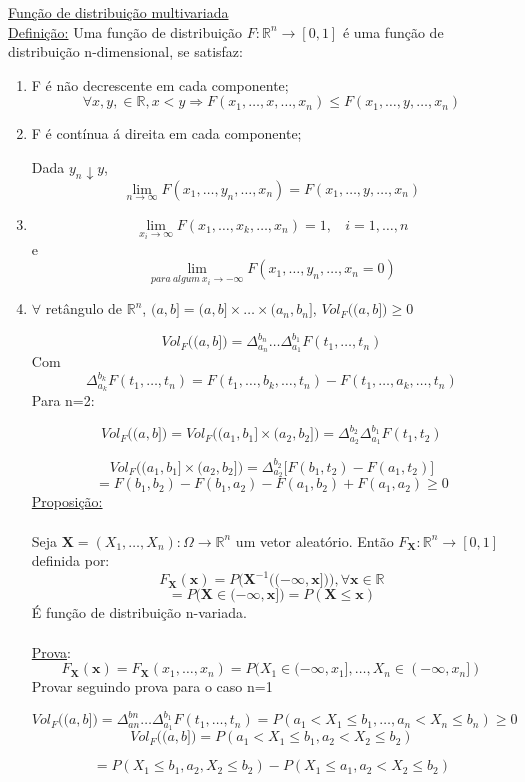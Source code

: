 \documentclass[a4paper,12pt]{article}
\begin{document}
\newpage
\underline{Função de distribuição multivariada }\\
\underline{Definição:} Uma função de distribuição $F:\mathbb R^n \longrightarrow[0,1]$ é uma função de distribuição n-dimensional, se satisfaz:
\begin{enumerate}[label=\roman*)]
	\item F é não decrescente em cada componente;
	$$\forall x,y,\in \mathbb R, x<y\Rightarrow 
	F(x_1,\ldots,x,\ldots,x_n)\le 	F(x_1,\ldots,y,\ldots,x_n)
	 $$
	 \item F é contínua á direita em cada componente;

Dada $y_n\downarrow y$,
$$\lim\limits_{n\rightarrow \infty} F(x_1,\ldots,y_n,\ldots,x_n)= 	F(x_1,\ldots,y,\ldots,x_n) $$
\item 
$$\lim\limits_{x_i\rightarrow \infty} F(x_1,\ldots,x_k,\ldots,x_n)=1, \ \ \ \ i=1,\ldots,n $$
e
$$\lim\limits_{para \ algum \ x_i\rightarrow- \infty} F(x_1,\ldots,y_n,\ldots,x_n=0)$$
\item  $\forall$ retângulo de $\mathbb R^n$, $(a,b ] =  (a,b ]\times\ldots\times (a_n,b_n ]$, $Vol_F\bigg(
 (a,b ]
\bigg)\ge 0 $

$$Vol_F\bigg(
(a,b ]
\bigg) =  \Delta^{b_n}_{a_n}\ldots\Delta^{b_1}_{a_1}F(t_1,\ldots,t_n)$$
Com
$$\Delta^{b_k}_{a_k}F(t_1,\ldots,t_n)=F(t_1,\ldots,b_k,\ldots,t_n) -F(t_1,\ldots,a_k,\ldots,t_n)  $$
Para n=2:

$$Vol_F\bigg((a,b]\bigg)=Vol_F\bigg(
(a_1,b_1]\times(a_2,b_2]
\bigg)=\Delta^{b_2}_{a_2}\Delta^{b_1}_{a_1}F(t_1,t_2) $$

$$Vol_F\bigg(
(a_1,b_1]\times(a_2,b_2]
\bigg)=\Delta^{b_2}_{a_2}\bigg[
F(b_1,t_2)-F(a_1,t_2)
\bigg] 
$$
$$
=
F(b_1,b_2)-F(b_1,a_2)-F(a_1,b_2)+F(a_1,a_2)\ge 0
$$
\newpage
\underline{Proposição:}\\
\\
Seja $\bm X=(X_1,\ldots,X_n):\Omega \longrightarrow \mathbb R^n$ um vetor aleatório. Então 
$F_{\bm X} :\mathbb R^n \longrightarrow [0,1]$ definida por:
$$F_{\bm X}(\bm x)= P\bigg(\bm X^{-1}\bigg((-\infty,\bm x]\bigg) \bigg), \forall \bm x\in \mathbb R $$
$$=P\bigg(\bm X \in (-\infty,\bm x]\bigg) =P(\bm X\le \bm x)  $$
É função de distribuição n-variada.\\
\\
\underline{Prova}:
$$F_{\bm X}(\bm x)=F_{\bm X}(x_1,\ldots,x_n)
=P(
X_1\in (-\infty,x_1],
\ldots,
X_n\in (-\infty,x_n]
) $$
Provar seguindo prova para o caso n=1

$$Vol_F\bigg(
(a,b]
\bigg)=
\Delta^{bn}_{an}\ldots\Delta_{a_1}^{b_1}F(t_1,\ldots,t_n)=P(a_1<X_1\le b_1,\ldots,a_n<X_n\le b_n) \ge 0$$
$$Vol_F\bigg(
(a,b]
\bigg)
=
P(a_1<X_1\le b_1,a_2<X_2\le b_2)
 $$
 
 $$
 =P(X_1\le b_1,a_2,X_2\le b_2) - P(X_1\le a_1,a_2<X_2\le b_2)
 $$
 



\end{enumerate}
	
\end{document}
